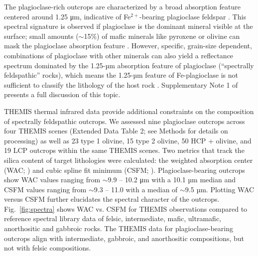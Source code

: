\documentclass[11pt]{article}
\begin{document}
The plagioclase-rich outcrops are characterized by a broad absorption feature centered around 1.25 μm, indicative of Fe$^{2+}$-bearing plagioclase feldspar \citep{Adams1967, Adams1973, Adams1978}. This spectral signature is observed if plagioclase is the dominant mineral visible at the surface; small amounts ($\sim$15\%) of mafic minerals like pyroxene or olivine can mask the plagioclase absorption feature \citep{Crown1987, Pompilio2007, Serventi2013, Serventi2015, Cheek2014}. However, specific, grain-size dependent, combinations of plagioclase with other minerals can also yield a reflectance spectrum dominated by the 1.25-µm absorption feature of plagioclase (``spectrally feldspathic'' rocks), which means the 1.25-µm feature of Fe-plagioclase is not sufficient to classify the lithology of the host rock \citep{Rogers2015, Barthez2023, Vannier2024}. Supplementary Note 1 of \citet{Phillips2022} presents a full discussion of this topic.

THEMIS thermal infrared data provide additional constraints on the composition of spectrally feldspathic outcrops. We assessed nine plagioclase outcrops across four THEMIS scenes (Extended Data Table 2; see Methods for details on processing) as well as 23 type 1 olivine, 15 type 2 olivine, 50 HCP + olivine, and 19 LCP outcrops within the same THEMIS scenes. Two metrics that track the silica content of target lithologies were calculated: the weighted absorption center (WAC; \citealt{Smith2013, Amador2016}) and cubic spline fit minimum (CSFM; \citealt{Rogers2015}). Plagioclase-bearing outcrops show WAC values ranging from $\sim$9.9 -- 10.2 μm with a 10.1 µm median and CSFM values ranging from $\sim$9.3 -- 11.0 with a median of $\sim$9.5 µm. Plotting WAC versus CSFM further elucidates the spectral character of the outcrops. Fig.~\ref{fig:spectra} shows WAC vs. CSFM for THEMIS observations compared to reference spectral library data of felsic, intermediate, mafic, ultramafic, anorthositic and gabbroic rocks. The THEMIS data for plagioclase-bearing outcrops align with intermediate, gabbroic, and anorthositic compositions, but not with felsic compositions.
\end{document}
